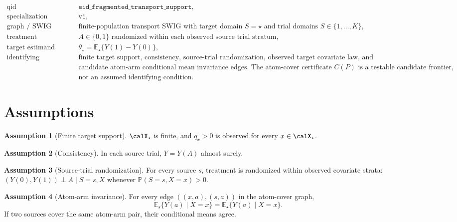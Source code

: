 \documentclass[11pt]{article}
\newcommand{\E}{\mathbb{E}}
\renewcommand{\Pr}{\mathbb{P}}
\theoremstyle{definition}
\newtheorem{assumption}{Assumption}
\theoremstyle{plain}
\theoremstyle{remark}
\begin{document}
\[
\begin{array}{ll}
\text{qid} & \texttt{eid\_fragmented\_transport\_support},\\
\text{specialization} & \texttt{v1},\\
\text{graph / SWIG} & \text{finite-population transport SWIG with target domain } S=\star
  \text{ and trial domains } S\in\{1,\ldots,K\},\\
\text{treatment} & A\in\{0,1\}\text{ randomized within each observed source trial stratum},\\
\text{target estimand} & \theta_\star=\E_\star\{Y(1)-Y(0)\},\\
\text{identifying restrictions} & \text{finite target support, consistency, source-trial randomization,}
  \text{ observed target covariate law, and}\\
& \text{candidate atom-arm conditional mean invariance edges. The atom-cover certificate }C(P)
  \text{ is a testable candidate frontier,}\\
& \text{not an assumed identifying condition.}
\end{array}
\]

\section{Assumptions}
\begin{assumption}[Finite target support]\label{ass:finite}
$\calX_\star$ is finite, and $q_x>0$ is observed for every $x\in\calX_\star$.
\end{assumption}

\begin{assumption}[Consistency]\label{ass:consistency}
In each source trial, $Y=Y(A)$ almost surely.
\end{assumption}

\begin{assumption}[Source-trial randomization]\label{ass:randomization}
For every source $s$, treatment is randomized within observed covariate strata: $(Y(0),Y(1))\perp A\mid S=s,X$ whenever $\Pr(S=s,X=x)>0$.
\end{assumption}

\begin{assumption}[Atom-arm invariance]\label{ass:invariance}
For every edge $((x,a),(s,a))$ in the atom-cover graph,
\[
\E_s\{Y(a)\mid X=x\}=\E_\star\{Y(a)\mid X=x\}.
\]
If two sources cover the same atom-arm pair, their conditional means agree.
\end{assumption}
\end{document}
